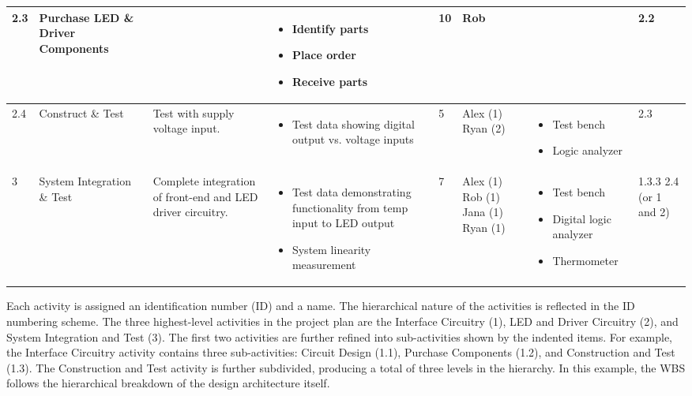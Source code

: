 \begin{table}
\begin{tabular}{|m{1cm}|m{1cm}|m{1cm}|m{1cm}|m{1cm}|m{1cm}|m{1cm}|m{1cm}|   }
2.3 &  Purchase LED \& Driver Components & & 
	\begin{itemize} \item Identify parts \item Place order \item Receive parts \end{itemize}
	& 10 & Rob & & 2.2 \\ \hline

2.4 & Construct \& Test & Test with supply voltage input. & 
	\begin{itemize} \item Test data showing digital output vs. voltage inputs \end{itemize}
	& 5 & Alex (1) Ryan (2) & \begin{itemize} \item Test bench \item Logic analyzer \end{itemize}
	& 2.3 \\ \hline

3 & System Integration \& Test & Complete integration of front-end and LED driver circuitry. & 
	\begin{itemize} \item Test data demonstrating functionality from temp input to LED output
					\item System linearity measurement \end{itemize}
	 & 7 & Alex (1) Rob (1) Jana (1) Ryan (1) & 
	\begin{itemize} \item Test bench \item Digital logic analyzer \item Thermometer \end{itemize}
	& 1.3.3 2.4 (or 1 and 2) \\ \hline
\end{tabular}
\end{table}


Each activity is assigned an identification number (ID) and a name. The
hierarchical nature of the activities is reflected in the ID numbering
scheme. The three highest-level activities in the project plan are the
Interface Circuitry (1), LED and Driver Circuitry (2), and System
Integration and Test (3). The first two activities are further refined
into sub-activities shown by the indented items. For example, the
Interface Circuitry activity contains three sub-activities: Circuit
Design (1.1), Purchase Components (1.2), and Construction and Test
(1.3). The Construction and Test activity is further subdivided,
producing a total of three levels in the hierarchy. In this example, the
WBS follows the hierarchical breakdown of the design architecture
itself.

